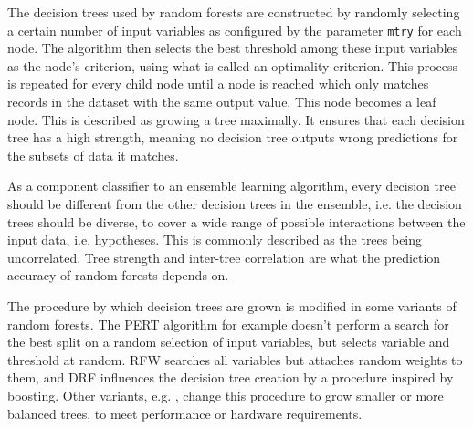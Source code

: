 \documentclass[a4paper,man,12pt,apacite,floatsintext,draftfirst]{apa6} %
\begin{document}
\begin{framed}
\begin{center}
\end{center}
\end{framed}

The decision trees used by random forests are constructed by randomly
selecting a certain number of input variables as configured by the parameter
\texttt{mtry} for each node.
The algorithm then selects the best threshold among these input
variables as the node's criterion, using what is called an optimality criterion.
This process is repeated for every child node until a node is reached
which only matches records in the dataset with the same output value.
This node becomes a leaf node.
This is described as growing a tree maximally.
It ensures that each decision tree has a high strength,
meaning no decision tree outputs wrong predictions for the subsets of data
it matches. \cite{breiman2001random}

As a component classifier to an ensemble learning algorithm,
every decision tree should be different from the other decision trees in
the ensemble, i.e. the decision trees should be diverse,
to cover a wide range of possible interactions between the input data,
i.e. hypotheses.
This is commonly described as the trees being uncorrelated.
Tree strength and inter-tree correlation are what the prediction accuracy
of random forests depends on. \cite{breiman2001random}

The procedure by which decision trees are grown is modified in some
variants of random forests.
The PERT algorithm \cite{cutler2001pert} for example doesn't perform a
search for the best split on a random selection of input variables,
but selects variable and threshold at random.
RFW \cite{maudes2012random} searches all variables but attaches random
weights to them, and DRF \cite{bernard2012dynamic} influences the
decision tree creation by a procedure inspired by boosting.
Other variants, e.g. \cite{van2012accelerating}, change this procedure to
grow smaller or more balanced trees, to meet performance or
hardware requirements.
\end{document}

